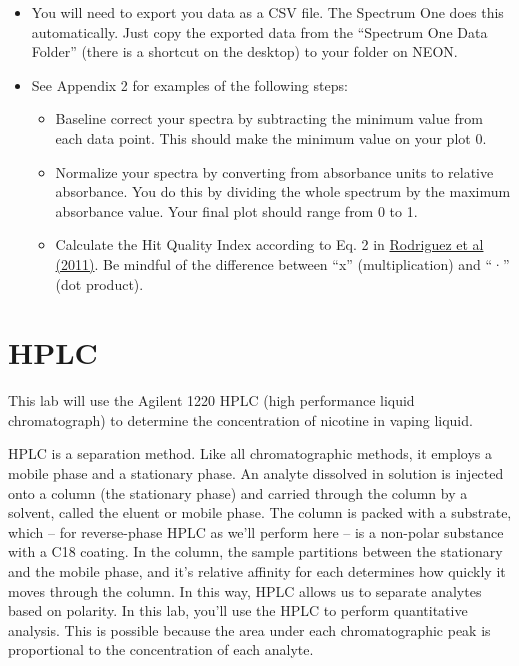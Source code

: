 \documentclass[]{tufte-book}
\providecommand{\tightlist}{%
  \setlength{\itemsep}{0pt}\setlength{\parskip}{0pt}}
\begin{document}
\begin{itemize}
\tightlist
\item
  You will need to export you data as a CSV file. The Spectrum One does this automatically. Just copy the exported data from the ``Spectrum One Data Folder'' (there is a shortcut on the desktop) to your folder on NEON.
\item
  See Appendix 2 for examples of the following steps:

  \begin{itemize}
  \tightlist
  \item
    Baseline correct your spectra by subtracting the minimum value from each data point. This should make the minimum value on your plot 0.
  \item
    Normalize your spectra by converting from absorbance units to relative absorbance. You do this by dividing the whole spectrum by the maximum absorbance value. Your final plot should range from 0 to 1.\\
  \item
    Calculate the Hit Quality Index according to Eq. 2 in \href{https://www.researchgate.net/publication/51602215_Standardization_of_Raman_spectra_for_transfer_of_spectral_libraries_across_different_instruments}{Rodriguez et al (2011)}. Be mindful of the difference between ``x'' (multiplication) and ``·'' (dot product).
  \end{itemize}
\end{itemize}

\newpage

\hypertarget{hplc}{%
\section{HPLC}\label{hplc}}

This lab will use the Agilent 1220 HPLC (high performance liquid chromatograph) to determine the concentration of nicotine in vaping liquid.

HPLC is a separation method. Like all chromatographic methods, it employs a mobile phase and a stationary phase. An analyte dissolved in solution is injected onto a column (the stationary phase) and carried through the column by a solvent, called the eluent or mobile phase. The column is packed with a substrate, which -- for reverse-phase HPLC as we'll perform here -- is a non-polar substance with a C18 coating. In the column, the sample partitions between the stationary and the mobile phase, and it's relative affinity for each determines how quickly it moves through the column. In this way, HPLC allows us to separate analytes based on polarity. In this lab, you'll use the HPLC to perform quantitative analysis. This is possible because the area under each chromatographic peak is proportional to the concentration of each analyte.
\end{document}
